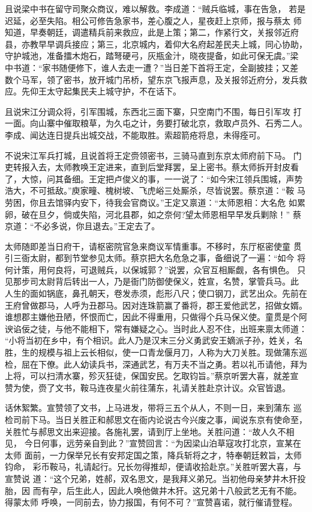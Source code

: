 且说梁中书在留守司聚众商议，难以解救。李成道：“贼兵临城，事在告急，
若是迟延，必至失陷。相公可修告急家书，差心腹之人，星夜赶上京师，报与蔡太
师知道，早奏朝廷，调遣精兵前来救应，此是上策；第二，作紧行文，关报邻近府
县，亦教早早调兵接应；第三，北京城内，着仰大名府起差民夫上城，同心协助，
守护城池，准备擂木炮石，踏弩硬弓，灰瓶金汁，晓夜提备，如此可保无虞。”梁
中书道：“家书随便修下，谁人去走一遭？”当日差下首将王定，全副披挂；又差
数个马军，领了密书，放开城门吊桥，望东京飞报声息，及关报邻近府分，发兵救
应。先仰王太守起集民夫上城守护，不在话下。

且说宋江分调众将，引军围城，东西北三面下寨，只空南门不围，每日引军攻
打一面。向山寨中催取粮草，为久屯之计，务要打破北京，救取卢员外、石秀二人。
李成、闻达连日提兵出城交战，不能取胜。索超箭疮将息，未得痊可。

不说宋江军兵打城，且说首将王定赍领密书，三骑马直到东京太师府前下马。
门吏转报入去，太师教唤王定进来，直到后堂拜罢，呈上密书。蔡太师拆开封皮看
了，大惊，问其备细。王定把卢俊义的事，一一说了：“如今宋江领兵围城，声势
浩大，不可抵敌。”庾家疃、槐树坡、飞虎峪三处厮杀，尽皆说罢。蔡京道：“鞍
马劳困，你且去馆驿内安下，待我会官商议。”王定又禀道：“太师恩相：大名危
如累卵，破在旦夕，倘或失陷，河北县郡，如之奈何?望太师恩相早早发兵剿除！”
蔡京道：“不必多说，你且退去。”王定去了。

太师随即差当日府干，请枢密院官急来商议军情重事。不移时，东厅枢密使童
贯引三衙太尉，都到节堂参见太师。蔡京把大名危急之事，备细说了一遍：“如今
将何计策，用何良将，可退贼兵，以保城郭？”说罢，众官互相厮觑，各有惧色。
只见那步司太尉背后转出一人，乃是衙门防御使保义，姓宣，名赞，掌管兵马。此
人生的面如锅底，鼻孔朝天，卷发赤须，彪形八尺；使口钢刀，武艺出众。先前在
王府曾做郡马，人呼为丑郡马。因对连珠箭赢了番将，郡王爱他武艺，招做女婿。
谁想郡主嫌他丑陋，怀恨而亡，因此不得重用，只做得个兵马保义使。童贯是个阿
谀谄佞之徒，与他不能相下，常有嫌疑之心。当时此人忍不住，出班来禀太师道：
“小将当初在乡中，有个相识。此人乃是汉末三分义勇武安王嫡派子孙，姓关，名
胜，生的规模与祖上云长相似，使一口青龙偃月刀，人称为大刀关胜。现做蒲东巡
检，屈在下僚。此人幼读兵书，深通武艺，有万夫不当之勇。若以礼币请他，拜为
上将，可以扫清水寨，殄灭狂徒，保国安民。乞取钧旨。”蔡京听罢大喜，就差宣
赞为使，赍了文书，鞍马连夜星火前往蒲东，礼请关胜赴京计议。众官皆退。

话休絮繁。宣赞领了文书，上马进发，带将三五个从人，不则一日，来到蒲东
巡检司前下马。当日关胜正和郝思文在衙内论说古今兴废之事，闻说东京有使命至，
关胜忙与郝思文出来迎接。各施礼罢，请到厅上坐地。关胜问道：“故人久不相见，
今日何事，远劳亲自到此？”宣赞回言：“为因梁山泊草寇攻打北京，宣某在太师
面前，一力保举兄长有安邦定国之策，降兵斩将之才，特奉朝廷敕旨，太师钧命，
彩币鞍马，礼请起行。兄长勿得推却，便请收拾赴京。”关胜听罢大喜，与宣赞说
道：“这个兄弟，姓郝，双名思文，是我拜义弟兄。当初他母亲梦井木犴投胎，因
而有孕，后生此人，因此人唤他做井木犴。这兄弟十八般武艺无有不能。得蒙太师
呼唤，一同前去，协力报国，有何不可？”宣赞喜诺，就行催请登程。


